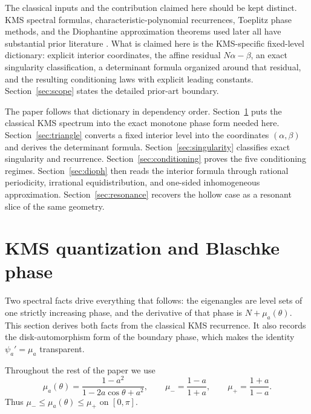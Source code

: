 \documentclass[11pt,reqno]{amsart}
\theoremstyle{plain}
\theoremstyle{definition}
\begin{document}
The classical inputs and the contribution claimed here should be kept distinct.
KMS spectral formulas, characteristic-polynomial recurrences, Toeplitz phase
methods, and the Diophantine approximation theorems used later all have substantial
prior literature
\cite{KMS,GrenanderSzego,ChremmosFikioris2016,Fikioris2018,BBGM2015,BBGM2016,
DaviesLevitin2014,BogoyaEtAl2026}.  What is claimed here is the KMS-specific
fixed-level dictionary: explicit interior coordinates, the affine residual
$N\alpha-\beta$, an exact singularity classification, a determinant formula organized
around that residual, and the resulting conditioning laws with explicit leading
constants.  Section~\ref{sec:scope} states the detailed prior-art boundary.

The paper follows that dictionary in dependency order.  Section~\ref{sec:kms}
puts the classical KMS spectrum into the exact monotone phase form needed here.
Section~\ref{sec:triangle} converts a fixed interior level into the coordinates
$(\alpha,\beta)$ and derives the determinant formula.  Section~\ref{sec:singularity}
classifies exact singularity and recurrence.  Section~\ref{sec:conditioning}
proves the five conditioning regimes.  Section~\ref{sec:dioph} then reads the
interior formula through rational periodicity, irrational equidistribution, and
one-sided inhomogeneous approximation.  Section~\ref{sec:resonance} recovers the
hollow case as a resonant slice of the same geometry.

\section{KMS quantization and Blaschke phase}\label{sec:kms}
Two spectral facts drive everything that follows: the eigenangles are level sets of
one strictly increasing phase, and the derivative of that phase is
$N+\mu_a(\theta)$.  This section derives both facts from the classical KMS
recurrence.  It also records the disk-automorphism form of the boundary phase, which
makes the identity $\psi_a'=\mu_a$ transparent.

Throughout the rest of the paper we use
\[
\mu_a(\theta)=\frac{1-a^2}{1-2a\cos\theta+a^2},
\qquad
\mu_- = \frac{1-a}{1+a},
\qquad
\mu_+ = \frac{1+a}{1-a}.
\]
Thus $\mu_-\le\mu_a(\theta)\le\mu_+$ on $[0,\pi]$.
\end{document}
